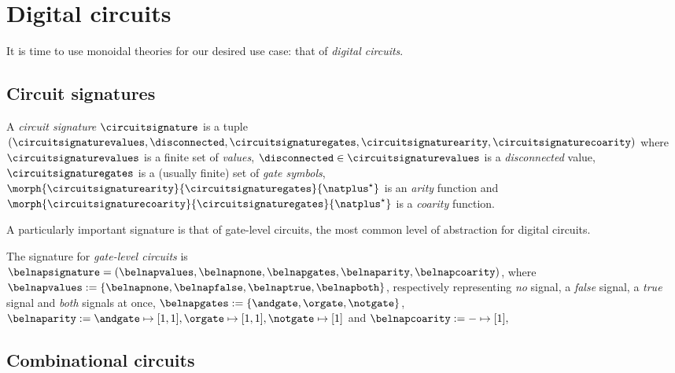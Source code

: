 \chapter{Digital circuits}

It is time to use monoidal theories for our desired use case: that of
\emph{digital circuits}.

\section{Circuit signatures}

\begin{definition}
    A \emph{circuit signature} \(\circuitsignature\) is a tuple \((
        \circuitsignaturevalues,
        \disconnected,
        \circuitsignaturegates,
        \circuitsignaturearity,
        \circuitsignaturecoarity
    )\) where \(\circuitsignaturevalues\) is a finite set of \emph{values}, \(
        \disconnected \in \circuitsignaturevalues
    \) is a \emph{disconnected} value, \(\circuitsignaturegates\) is a (usually
    finite) set of \emph{gate symbols}, \(
        \morph{\circuitsignaturearity}{\circuitsignaturegates}{\natplus^\star}
    \) is an \emph{arity} function and \(
        \morph{\circuitsignaturecoarity}{\circuitsignaturegates}{\natplus^\star}
    \) is a \emph{coarity} function.
\end{definition}

A particularly important signature is that of gate-level circuits, the most
common level of abstraction for digital circuits.

\begin{example}\label{ex:sig}
    The signature for \emph{gate-level circuits} is \(
        \belnapsignature = (
            \belnapvalues,
            \belnapnone,
            \belnapgates,
            \belnaparity,
            \belnapcoarity
    )\), where \(
        \belnapvalues := \{\belnapnone, \belnapfalse, \belnaptrue, \belnapboth\}
    \), respectively representing \emph{no} signal, a \emph{false} signal, a
        \emph{true} signal and \emph{both} signals at once, \(
        \belnapgates := \{\andgate,\orgate,\notgate\}
    \), \(
        \belnaparity :=
            \andgate \mapsto [1,1],
            \orgate \mapsto [1,1],
            \notgate \mapsto [1]
    \) and \(
        \belnapcoarity := - \mapsto [1],
    \)
\end{example}

\section{Combinational circuits}

